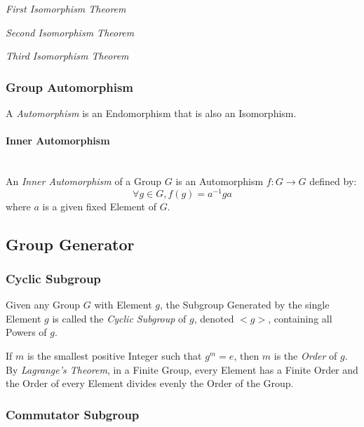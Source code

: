 \emph{First Isomorphism Theorem}

\emph{Second Isomorphism Theorem}

\emph{Third Isomorphism Theorem}



\subsubsection{Group Automorphism}\label{sec:group_automorphism}

A \emph{Automorphism} is an Endomorphism that is also an Isomorphism.



\paragraph{Inner Automorphism}\label{sec:inner_automorphism}
\hfill \\

An \emph{Inner Automorphism} of a Group $G$ is an Automorphism $f : G
\rightarrow G$ defined by:
\[
    \forall g \in G, f(g) = a^{-1}ga
\]
where $a$ is a given fixed Element of $G$.



\subsection{Group Generator}\label{sec:group_generator}

\subsubsection{Cyclic Subgroup}\label{sec:cyclic_subgroup}

Given any Group $G$ with Element $g$, the Subgroup Generated by the
single Element $g$ is called the \emph{Cyclic Subgroup} of $g$,
denoted $<g>$, containing all Powers of $g$.

If $m$ is the smallest positive Integer such that $g^m = e$, then $m$
is the \emph{Order} of $g$. By \emph{Lagrange's Theorem}, in a Finite
Group, every Element has a Finite Order and the Order of every Element
divides evenly the Order of the Group.



\subsubsection{Commutator Subgroup}\label{sec:commutator_subgroup}

